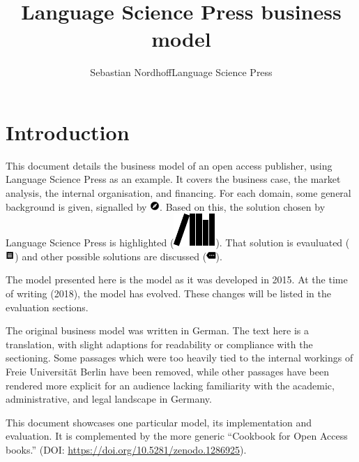 \documentclass[nonflat,smallfont
]{langsci/langscibook}
\title{Language Science Press business model}
\author{Sebastian Nordhoff\newlineCover Language Science Press}
\begin{document}
\maketitle
\tableofcontents
\mainmatter
\chapter{Introduction}
This document details the business model of an open access publisher, using Language Science Press as an example. It covers the
business case,
the market analysis, 
the internal organisation, 
and financing. 
For each domain, some general background is given, signalled by 
{\color{yellow}\includegraphics[height=1em,trim=0 1.5mm 0 -1.5mm]{langsci/graphics/explore.pdf}}.
Based on this, the solution chosen by Language Science Press is highlighted
({\color{lsLightBlue}\includegraphics[height=.7em,trim=-.5mm 1mm 0 -.5mm]{langsci/graphics/tbls-langsci.pdf}}).
That solution is evauluated 
({\color{lsLightOrange}\includegraphics[height=1em,trim=0 1.5mm 0 -1.5mm]{langsci/graphics/tbls-receipt.pdf}}) 
 and other possible solutions are discussed 
({\color{lsDarkGreenOne}\includegraphics[height=1em,trim=0 1.5mm 0 -1.5mm]{langsci/graphics/tbls-more.pdf}}). 

The model presented here is the model as it was developed in 2015.
At the time of writing (2018), the model has evolved. These changes will be listed in the evaluation sections. 

The original business model was written in German. The text here is a translation, with slight adaptions for readability or compliance with the sectioning. Some passages which were too heavily tied to the internal workings of Freie Universität Berlin have been removed, while other passages have been rendered more explicit for an audience lacking familiarity with the academic, administrative, and legal landscape in Germany. 

This document showcases one particular model, its implementation and evaluation. It is complemented by the more generic ``Cookbook for Open Access books.'' (DOI: \url{https://doi.org/10.5281/zenodo.1286925}).
\end{document}
